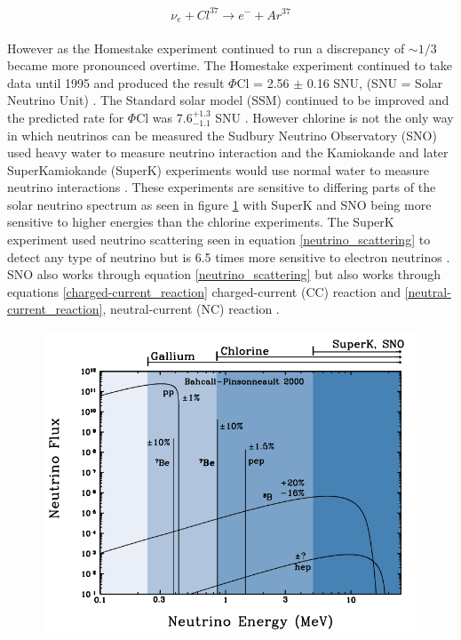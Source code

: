 \begin{equation}
    \nu_e + Cl^{37} \rightarrow  e^- + Ar^{37}
    \label{neutrino_chlorine_decay}
\end{equation}
\\However as the Homestake experiment continued to run a discrepancy of $\sim 1/3$ became more pronounced overtime. The Homestake experiment continued to take data until 1995 and produced the result $\Phi$Cl = 2.56 $\pm$ 0.16 SNU, (SNU = Solar Neutrino Unit) \cite{Bellerive:2003rj}. The Standard solar model (SSM) continued to be improved and the predicted rate for $\Phi$Cl was 7.6$^{+ 1.3}_{-1.1}$ SNU \cite{Bellerive:2003rj}. However chlorine is not the only way in which neutrinos can be measured the Sudbury Neutrino Observatory (SNO) used heavy water to measure neutrino interaction and the Kamiokande and later SuperKamiokande (SuperK) experiments would use normal water to measure neutrino interactions \cite{Bellerive:2003rj}. These experiments are sensitive to differing parts of the solar neutrino spectrum as seen in figure \ref{neutrino_emmision_graph} with SuperK and SNO being more sensitive to higher energies than the chlorine experiments. The SuperK experiment used neutrino scattering seen in equation \ref{neutrino_scattering} to detect any type of neutrino but is 6.5 times more sensitive to electron neutrinos \cite{griffiths2008book} \cite{griffiths2008neutrinoOscillations}. SNO also works through equation \ref{neutrino_scattering} but also works through equations \ref{charged-current_reaction} charged-current (CC) reaction  and \ref{neutral-current_reaction}, neutral-current (NC) reaction \cite{sno2001}\cite{Bellerive:2003rj} \cite{griffiths2008book} \cite{griffiths2008neutrinoOscillations}. 
\begin{figure}[htbp]
 \centering
 \includegraphics[height=90mm]{Chapter1/Figs/Raster/neutrino_emmision_graph.png}
 \label{neutrino_emmision_graph}
\end{figure}
